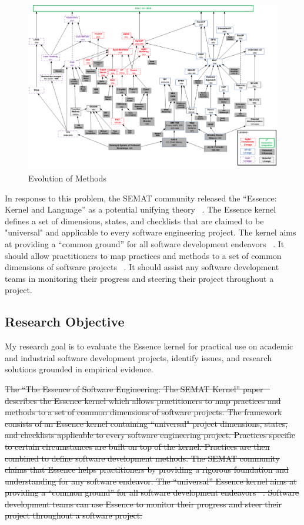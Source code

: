 \documentclass[preprint,12pt,3p]{elsarticle}
\begin{document}
\begin{figure}[h]\vspace*{4pt}
\centerline{\includegraphics[width=5.4in]{field_study_images/EvolutionOfMethods}}
\caption{Evolution of Methods}\vspace*{-6pt}\label{EvolutionOfMethods}
\end{figure}

In response to this problem, the SEMAT community released the “Essence: Kernel and Language” as a potential unifying theory  ~\cite{OMGStandard}. The Essence kernel defines a set of dimensions, states, and checklists that are claimed to be "universal" and applicable to every software engineering project. The kernel aims at providing a “common ground” for all software development endeavors ~\cite{JacobsonQueue}. It should allow practitioners to map practices and methods to a set of common dimensions of software projects ~\cite{JacobsonQueue}.  It should assist any software development teams in monitoring their progress and steering their project throughout a project.

\subsection{Research Objective}
My research goal is to evaluate the Essence kernel for practical use on academic and industrial software development projects, identify issues, and research solutions grounded in empirical evidence.

\sout{The ``The Essence of Software Engineering: The SEMAT Kernel'' paper ~\cite{JacobsonQueue} describes the Essence kernel which allows practitioners to map practices and methods to a set of common dimensions of software projects. The framework consists of an Essence kernel containing ``universal" project dimensions, states, and checklists applicable to every software engineering project. Practices specific to certain circumstances are built on top of the kernel. Practices are then combined to define software development methods. The SEMAT community claims that Essence helps practitioners by providing a rigorous foundation and understanding for any software endeavor.  The “universal” Essence kernel aims at providing a “common ground” for all software development endeavors ~\cite{JacobsonQueue}. Software development teams can use Essence to monitor their progress and steer their project throughout a software project. }
\end{document}
